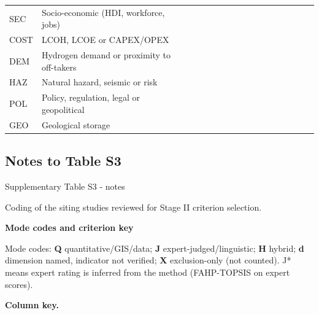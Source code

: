 \documentclass[11pt,a4paper]{article}
\begin{document}
\begin{landscape}
{\begin{longtable}{l>{\raggedright\arraybackslash}p{2.82cm}llllllllllllllll}
SEC & Socio-economic (HDI, workforce, jobs) &  &  &  &  &  &  &  &  &  &  &  &  &  &  &  &  \\
COST & LCOH, LCOE or CAPEX/\allowbreak{}OPEX &  &  &  &  &  &  &  &  &  &  &  &  &  &  &  &  \\
DEM & Hydrogen demand or proximity to off-takers &  &  &  &  &  &  &  &  &  &  &  &  &  &  &  &  \\
HAZ & Natural hazard, seismic or risk &  &  &  &  &  &  &  &  &  &  &  &  &  &  &  &  \\
POL & Policy, regulation, legal or geopolitical &  &  &  &  &  &  &  &  &  &  &  &  &  &  &  &  \\
GEO & Geological storage &  &  &  &  &  &  &  &  &  &  &  &  &  &  &  &  \\
\end{longtable}
}

\end{landscape}

\subsection{Notes to Table S3}

Supplementary Table S3 - notes

Coding of the siting studies reviewed for Stage II criterion selection.

\textbf{Mode codes and criterion key}

Mode codes: \textbf{Q} quantitative/GIS/data; \textbf{J} expert-judged/linguistic; \textbf{H} hybrid; \textbf{d} dimension named, indicator not verified; \textbf{X} exclusion-only (not counted). J* means expert rating is inferred from the method (FAHP-TOPSIS on expert scores).

\textbf{Column key.}
\end{document}
